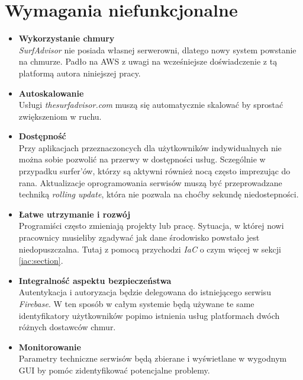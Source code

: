 \section{Wymagania niefunkcjonalne}

\begin{itemize}
    \item
    \textbf{Wykorzystanie chmury}\\
    \emph{SurfAdvisor} nie posiada własnej serwerowni, dlatego nowy system powstanie na chmurze.
    Padło na AWS z uwagi na wcześniejsze doświadczenie z tą platformą autora niniejszej pracy.

    \item
    \textbf{Autoskalowanie}\\
    Usługi \emph{thesurfadvisor.com} muszą się automatycznie skalować by sprostać zwiększeniom w ruchu.

    \item
    \textbf{Dostępność}\\
    Przy aplikacjach przeznaczoncych dla użytkowników indywidualnych nie można sobie pozwolić na przerwy w dostępności usług.
    Sczególnie w przypadku surfer'ów, którzy są aktywni również nocą często imprezując do rana.
    Aktualizacje oprogramowania serwisów muszą być przeprowadzane techniką \emph{rolling update}, która nie pozwala na choćby sekundę niedostepności.

    \item
    \textbf{Łatwe utrzymanie i rozwój}\\
    Programiści często zmieniają projekty lub pracę. Sytuacja, w której nowi pracownicy musieliby zgadywać jak dane środowisko powstało jest niedopuszczalna.
    Tutaj z pomocą przychodzi \emph{IaC} o czym więcej w sekcji \ref{iac:section}.

    \item
    \textbf{Integralność aspektu bezpieczeństwa}\\
    Autentykacja i autoryzacja będzie delegowana do istniejącego serwisu \emph{Firebase}. 
    W ten sposób w całym systemie będą używane te same identyfikatory użytkowników popimo istnienia usług platformach dwóch różnych dostawców chmur.

    \item
    \textbf{Monitorowanie}\\
    Parametry techniczne serwisów będą zbierane i wyświetlane w wygodnym GUI by pomóc zidentyfikować potencjalne problemy.

\end{itemize} 


